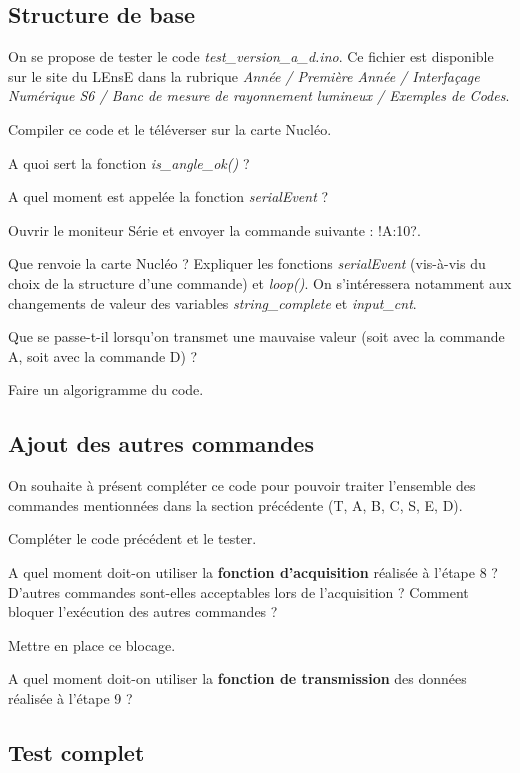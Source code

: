 \documentclass[a4paper,11pt,titlepage]{article} %
\begin{document}
\subsection{Structure de base}

On se propose de tester le code \textsl{test\_version\_a\_d.ino}. Ce fichier est disponible sur le site du LEnsE dans la rubrique \textit{Année / Première Année / Interfaçage Numérique S6 / Banc de mesure de rayonnement lumineux / Exemples de Codes}.

\Manip Compiler ce code et le téléverser sur la carte Nucléo.

\Quest A quoi sert la fonction \textsl{is\_angle\_ok()} ?

\Quest A quel moment est appelée la fonction \textsl{serialEvent} ?

\Manip Ouvrir le moniteur Série et envoyer la commande suivante : \textsc{!A:10?}.

\Quest Que renvoie la carte Nucléo ? Expliquer les fonctions \textsl{serialEvent} (vis-à-vis du choix de la structure d'une commande) et \textsl{loop()}. On s'intéressera notamment aux changements de valeur des variables \textsl{string\_complete} et \textsl{input\_cnt}.

\Quest Que se passe-t-il lorsqu'on transmet une mauvaise valeur (soit avec la commande A, soit avec la commande D) ?

\Quest Faire un algorigramme du code.

\subsection{Ajout des autres commandes}

On souhaite à présent compléter ce code pour pouvoir traiter l'ensemble des commandes mentionnées dans la section précédente (T, A, B, C, S, E, D).

\Manip Compléter le code précédent et le tester.

\Quest A quel moment doit-on utiliser la \textbf{fonction d'acquisition} réalisée à l'étape 8 ? D'autres commandes sont-elles acceptables lors de l'acquisition ? Comment bloquer l'exécution des autres commandes ?

\Manip Mettre en place ce blocage.

\Quest A quel moment doit-on utiliser la \textbf{fonction de transmission} des données réalisée à l'étape 9 ?


\subsection{Test complet}
\end{document}
